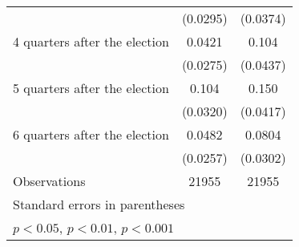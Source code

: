 \begin{table}[htbp]
\begin{tabular}{l*{2}{c}}
                    &    (0.0295)         &    (0.0374)         \\
[1em]
 4 quarters after the election&      0.0421         &       0.104\sym{*}  \\
                    &    (0.0275)         &    (0.0437)         \\
[1em]
 5 quarters after the election&       0.104\sym{**} &       0.150\sym{***}\\
                    &    (0.0320)         &    (0.0417)         \\
[1em]
 6 quarters after the election&      0.0482         &      0.0804\sym{**} \\
                    &    (0.0257)         &    (0.0302)         \\
\hline
Observations        &       21955         &       21955         \\
\hline\hline
\multicolumn{3}{l}{\footnotesize Standard errors in parentheses}\\
\multicolumn{3}{l}{\footnotesize \sym{*} \(p<0.05\), \sym{**} \(p<0.01\), \sym{***} \(p<0.001\)}\\
\end{tabular}
\end{table}
